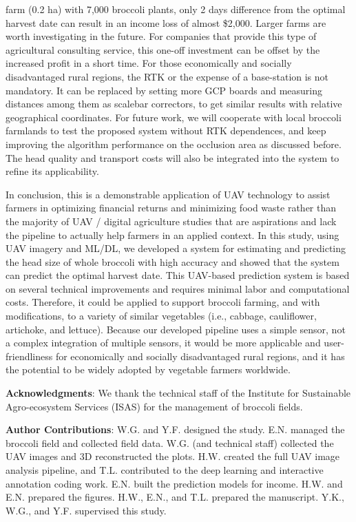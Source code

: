 farm (0.2 ha) with 7,000 broccoli plants, only 2 days difference from the optimal harvest date can result in an income loss of almost \$2,000. Larger farms are worth investigating in the future. For companies that provide this type of agricultural consulting service, this one-off investment can be offset by the increased profit in a short time. For those economically and socially disadvantaged rural regions, the RTK or the expense of a base-station is not mandatory. It can be replaced by setting more GCP boards and measuring distances among them as scalebar correctors, to get similar results with relative geographical coordinates. For future work, we will cooperate with local broccoli farmlands to test the proposed system without RTK dependences, and keep improving the algorithm performance on the occlusion area as discussed before. The head quality and transport costs will also be integrated into the system to refine its applicability.

In conclusion, this is a demonstrable application of UAV technology to assist farmers in optimizing financial returns and minimizing food waste rather than the majority of UAV / digital agriculture studies that are aspirations and lack the pipeline to actually help farmers in an applied context. In this study, using UAV imagery and ML/DL, we developed a system for estimating and predicting the head size of whole broccoli with high accuracy and showed that the system can predict the optimal harvest date. This UAV-based prediction system is based on several technical improvements and requires minimal labor and computational costs. Therefore, it could be applied to support broccoli farming, and with modifications, to a variety of similar vegetables (i.e., cabbage, cauliflower, artichoke, and lettuce). Because our developed pipeline uses a simple sensor, not a complex integration of multiple sensors, it would be more applicable and user-friendliness for economically and socially disadvantaged rural regions, and it has the potential to be widely adopted by vegetable farmers worldwide.

\hspace*{\fill}

\noindent \textbf{Acknowledgments}: We thank the technical staff of the Institute for Sustainable Agro-ecosystem Services (ISAS) for the management of broccoli fields. 

\hspace*{\fill}

\noindent \textbf{Author Contributions}: W.G. and Y.F. designed the study. E.N. managed the broccoli field and collected field data. W.G. (and technical staff) collected the UAV images and 3D reconstructed the plots. H.W. created the full UAV image analysis pipeline, and T.L. contributed to the deep learning and interactive annotation coding work. E.N. built the prediction models for income. H.W. and E.N. prepared the figures. H.W., E.N., and T.L. prepared the manuscript. Y.K., W.G., and Y.F. supervised this study.


